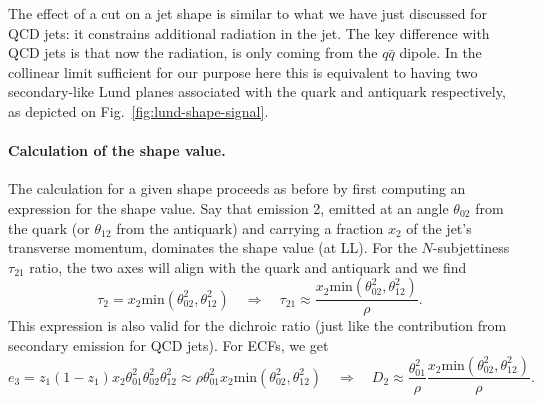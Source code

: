 The effect of a cut on a jet shape is similar to what we have just
discussed for QCD jets: it constrains additional radiation in the
jet.
%
The key difference with QCD jets is that now the radiation, is only
coming from the $q\bar q$ dipole. In the collinear limit sufficient
for our purpose here this is equivalent to having two secondary-like
Lund planes associated with the quark and antiquark respectively, as
depicted on Fig.~\ref{fig:lund-shape-signal}.

\paragraph{Calculation of the shape value.}
%
The calculation for a given shape proceeds as before by first
computing an expression for the shape value. Say that emission 2,
emitted at an angle $\theta_{02}$ from the quark (or $\theta_{12}$ from
the antiquark) and carrying a fraction $x_2$ of the jet's transverse
momentum, dominates the shape value (at LL). For the $N$-subjettiness
$\tau_{21}$ ratio, the two axes will align with the quark and
antiquark and we find
%
\begin{equation}
  \tau_2 = x_2 \text{min}(\theta_{02}^2,\theta_{12}^2)
    \quad \Rightarrow\quad
  \tau_{21}\approx\frac{x_2  \text{min}(\theta_{02}^2,\theta_{12}^2)}{\rho}.
\end{equation}
This expression is also valid for the dichroic ratio (just like the
contribution from secondary emission for QCD jets).
%
For ECFs, we get
\begin{equation}
  e_3 = z_1 (1-z_1) x_2 \theta_{01}^2\theta_{02}^2\theta_{12}^2
  \approx \rho\theta_{01}^2 x_2
  \text{min}(\theta_{02}^2,\theta_{12}^2)
  \quad \Rightarrow\quad
  D_2\approx \frac{\theta_{01}^2}{\rho}
  \frac{x_2  \text{min}(\theta_{02}^2,\theta_{12}^2)}{\rho}.
\end{equation}

